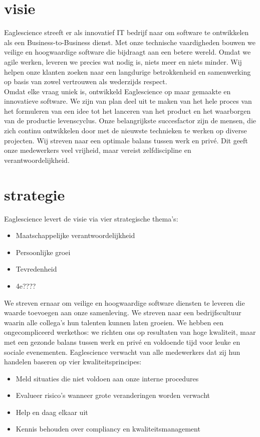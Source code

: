 \section{visie}
Eaglescience streeft er als innovatief IT bedrijf naar om software te ontwikkelen als een Business-to-Business dienst. Met onze technische vaardigheden bouwen we veilige en hoogwaardige software die bijdraagt aan een betere wereld. Omdat we agile werken, leveren we precies wat nodig is, niets meer en niets minder. Wij helpen onze klanten zoeken naar een langdurige betrokkenheid en samenwerking op basis van zowel vertrouwen als wederzijds respect. \\
Omdat elke vraag uniek is, ontwikkeld Eaglescience op maar gemaakte en innovatieve software. We zijn van plan deel uit te maken van het hele proces van het formuleren van een idee tot het lanceren van het product en het waarborgen van de productie levenscyclus. Onze belangrijkste succesfactor zijn de mensen, die zich continu ontwikkelen door met de nieuwste technieken te werken op diverse projecten. Wij streven naar een optimale balans tussen werk en priv\'e. Dit geeft onze medewerkers veel vrijheid, maar vereist zelfdiscipline en verantwoordelijkheid.

\section{strategie}
Eaglescience levert de visie via vier strategische thema's:
\begin{itemize}
\item Maatschappelijke verantwoordelijkheid
\item Persoonlijke groei
\item Tevredenheid
\item 4e???? %
\end{itemize}
We streven ernaar om veilige en hoogwaardige software diensten te leveren die waarde toevoegen aan onze samenleving. We streven naar een bedrijfscultuur waarin alle collega's hun talenten kunnen laten groeien. We hebben een ongecompliceerd werkethos: we richten ons op resultaten van hoge kwaliteit, maar met een gezonde balans tussen werk en priv\'e en voldoende tijd voor leuke en sociale evenementen. Eaglescience verwacht van alle medewerkers dat zij hun handelen baseren op vier kwaliteitsprincipes:
\begin{itemize}
\item Meld situaties die niet voldoen aan onze interne procedures
\item Evalueer risico's wanneer grote veranderingen worden verwacht
\item Help en daag elkaar uit
\item Kennis behouden over compliancy en kwaliteitsmanagement
\end{itemize}

